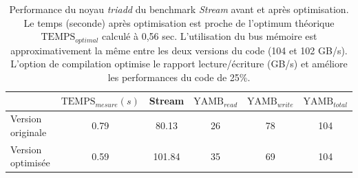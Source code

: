             
            \begin{table}[htbp]
            \centering
            \caption{Performance du noyau \textit{triadd} du benchmark \textit{Stream} avant et après optimisation. Le temps (seconde) après optimisation est proche de l'optimum théorique $\text{TEMPS}_{optimal}$  calculé à 0,56 sec. L'utilisation du bus mémoire est approximativement la même entre les deux versions du code (104 et 102 GB/s). L'option de compilation optimise le rapport lecture/écriture (GB/s) et améliore les performances du code de 25\%.}
            \begin{tabular}{l|c|c|c|c|c|}
            \cline{2-6}
            & $\text{TEMPS}_{mesure} (s)$ & Stream   & $\text{YAMB}_{read}$  & $\text{YAMB}_{write}$  & $\text{YAMB}_{total}$  \\ \hline
            \multicolumn{1}{|l|}{Version originale}  & 0.79   & 80.13  & 26        & 78         & 104        \\ \hline
            \multicolumn{1}{|l|}{Version optimisée} & 0.59   & 101.84 & 35        & 69         & 104        \\ \hline
            \end{tabular}
            \label{table:stream_res}
            \end{table}